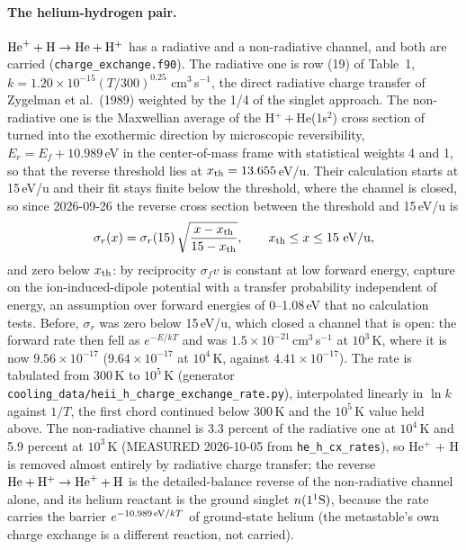 \paragraph{The helium-hydrogen pair.} ${\rm He}^+ + {\rm H} \to
{\rm He} + {\rm H}^+$ has a radiative and a non-radiative channel, and both
are carried (\texttt{charge\_exchange.f90}).  The radiative one is row (19)
of \citet{Stancil1998} Table~1, $k = 1.20\times10^{-15}(T/300)^{0.25}$
cm$^3$\,s$^{-1}$, the direct radiative charge transfer of Zygelman et al.\
(1989) weighted by the 1/4 of the singlet approach.  The non-radiative one is
the Maxwellian average of the H$^+$\,$+$\,He(1s$^2$) cross section of
\citet{Loreau2014} turned into the exothermic direction by microscopic
reversibility, $E_r = E_f + 10.989$\,eV in the center-of-mass frame with
statistical weights 4 and 1, so that the reverse threshold lies at
$x_{\rm th} = 13.655$\,eV/u.  Their calculation starts at 15\,eV/u and their
fit stays finite below the threshold, where the channel is closed, so since
2026-09-26 the reverse cross section between the threshold and 15\,eV/u is
%
\begin{equation}
  \sigma_r(x) = \sigma_r(15)\,
  \sqrt{\frac{x - x_{\rm th}}{15 - x_{\rm th}}},\qquad
  x_{\rm th} \le x \le 15\ {\rm eV/u},
  \label{eq:ion:heph_threshold}
\end{equation}
%
and zero below $x_{\rm th}$: by reciprocity $\sigma_f v$ is constant at low
forward energy, capture on the ion-induced-dipole potential with a transfer
probability independent of energy, an assumption over forward energies of
0--1.08\,eV that no calculation tests.  Before, $\sigma_r$ was zero below
15\,eV/u, which closed a channel that is open: the forward rate then fell as
$e^{-E/kT}$ and was $1.5\times10^{-21}$\,cm$^3$\,s$^{-1}$ at $10^3$\,K, where
it is now $9.56\times10^{-17}$ ($9.64\times10^{-17}$ at $10^4$\,K, against
$4.41\times10^{-17}$).  The rate is tabulated from 300\,K to $10^5$\,K
(generator \texttt{cooling\_data/heii\_h\_charge\_exchange\_rate.py}),
interpolated linearly in $\ln k$ against $1/T$, the first chord continued
below 300\,K and the $10^5$\,K value held above.  The non-radiative channel
is 3.3 percent of the radiative one at $10^4$\,K and 5.9 percent at
$10^3$\,K (MEASURED 2026-10-05 from \texttt{he\_h\_cx\_rates}), so He$^+$ + H
is removed almost entirely by radiative charge transfer; the reverse
${\rm He} + {\rm H}^+ \to {\rm He}^+ + {\rm H}$ is the detailed-balance
reverse of the non-radiative channel alone, and its helium reactant is the
ground singlet $n(1^1{\rm S})$, because the rate carries the barrier
$e^{-10.989\,{\rm eV}/kT}$ of ground-state helium (the metastable's own
charge exchange is a different reaction, not carried).

